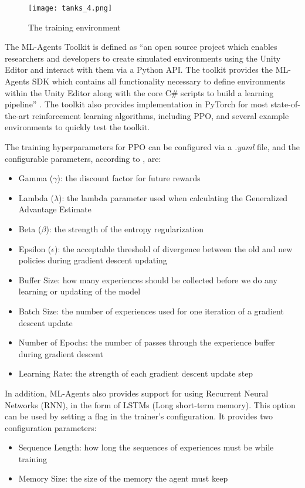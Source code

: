 \begin{figure}
    \begin{center}
        \texttt{[image: tanks\_4.png]}
        \caption{The training environment}
        \label{photo:tank_training_env}
    \end{center}
\end{figure}

The ML-Agents Toolkit is defined as \enquote{an open source project which enables researchers and developers to create simulated environments using the Unity Editor and interact with them via a Python API. The toolkit provides the ML-Agents SDK which contains all functionality necessary to define environments within the Unity Editor along with the core C\# scripts to build a learning pipeline} \cite{juliani2020unityai}. The toolkit also provides implementation in PyTorch for most state-of-the-art reinforcement learning algorithms, including PPO, and several example environments to quickly test the toolkit.

The training hyperparameters for PPO can be configured via a \emph{.yaml} file, and the configurable parameters, according to \cite{mlagents_api_docs}, are:
\begin{itemize}
    \item Gamma ($\gamma$): the discount factor for future rewards
    \item Lambda ($\lambda$): the lambda parameter used when calculating the Generalized Advantage Estimate
    \item Beta ($\beta$): the strength of the entropy regularization
    \item Epsilon ($\epsilon$): the acceptable threshold of divergence between the old and new policies during gradient descent updating
    \item Buffer Size: how many experiences should be collected before we do any learning or updating of the model
    \item Batch Size: the number of experiences used for one iteration of a gradient descent update
    \item Number of Epochs: the number of passes through the experience buffer during gradient descent
    \item Learning Rate: the strength of each gradient descent update step
\end{itemize}

In addition, ML-Agents also provides support for using Recurrent Neural Networks (RNN), in the form of LSTMs (Long short-term memory). This option can be used by setting a flag in the trainer's configuration. It provides two configuration parameters:
\begin{itemize}
    \item Sequence Length: how long the sequences of experiences must be while training
    \item Memory Size: the size of the memory the agent must keep
\end{itemize}

